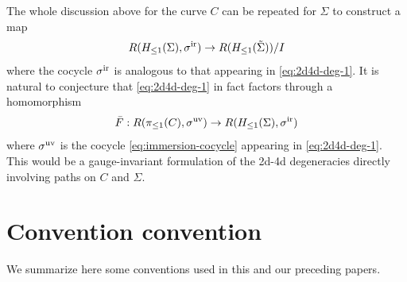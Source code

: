 \documentclass[11pt,a4paper]{article}
\begin{document}
The whole discussion above for the curve $C$ can be repeated
for $\Sigma$ to construct a map
\begin{equation}\label{eq:whole-disc}
R(H_{\leq 1}(\Sigma), \sigma^{\rm ir}) \to R(H_{\leq 1}(\tilde \Sigma))/I
\end{equation}
where the cocycle $\sigma^{\rm ir}$ is analogous to that
appearing in \eqref{eq:2d4d-deg-1}. It is natural to conjecture that
\eqref{eq:2d4d-deg-1} in fact factors through a homomorphism
\begin{equation}\label{eq:2d4d-deg-3}
\bar F: R(\pi_{\leq 1}(C),\sigma^{\rm uv}) \to R(H_{\leq 1}(\Sigma), \sigma^{\rm ir})
\end{equation}
where $\sigma^{\rm uv}$ is the cocycle \eqref{eq:immersion-cocycle}
appearing in \eqref{eq:2d4d-deg-1}. This would be a gauge-invariant
formulation of the 2d-4d degeneracies directly involving paths on
$C$ and $\Sigma$.


\section{Convention convention}\label{app:Conv-conv}

We summarize here some conventions used in this
and our preceding papers.
\end{document}
